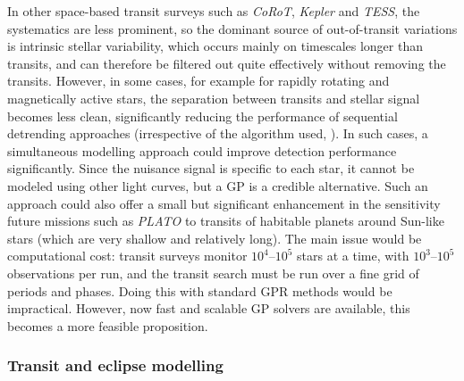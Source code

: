 \documentclass[letterpaper]{ar-1col}
\begin{document}
In other space-based transit surveys such as \textit{CoRoT}, \emph{Kepler} and \emph{TESS}, the systematics are less prominent, so the dominant source of out-of-transit variations is intrinsic stellar variability, which occurs mainly on timescales longer than transits, and can therefore be filtered out quite effectively without removing the transits. However, in some cases, for example for rapidly rotating and magnetically active stars, the separation between transits and stellar signal becomes less clean, significantly reducing the performance of sequential detrending approaches (irrespective of the algorithm used, \citealt{wotan}).
In such cases, a simultaneous modelling approach could improve detection performance significantly. Since the nuisance signal is specific to each star, it cannot be modeled using other light curves, but a GP is a credible alternative. Such an approach could also offer a small but significant enhancement in the sensitivity future missions such as \textit{PLATO} to transits of habitable planets around Sun-like stars (which are very shallow and relatively long). The main issue would be computational cost: transit surveys monitor $10^4$--$10^5$ stars at a time, with $10^3$--$10^5$ observations per run, and the transit search must be run over a fine grid of periods and phases. Doing this with standard GPR methods would be impractical. However, now fast and scalable GP solvers are available, this becomes a more feasible proposition.

\subsubsection{Transit and eclipse modelling}
\label{sec:transit_fit}
\end{document}
